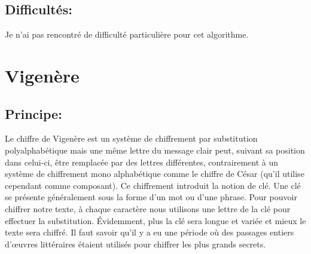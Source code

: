 \documentclass{article}
\begin{document}
\subsection{Difficultés:}
Je n'ai pas rencontré de difficulté particulière pour cet algorithme.

\newpage

\section{Vigenère}
\subsection{Principe:}
Le chiffre de Vigenère est un système de chiffrement par substitution polyalphabétique mais une même lettre du message clair peut, suivant sa position dans celui-ci, être remplacée par des lettres différentes, contrairement à un système de chiffrement mono alphabétique comme le chiffre de César (qu'il utilise cependant comme composant).\newline
Ce chiffrement introduit la notion de clé. Une clé se présente généralement sous la forme d'un mot ou d'une phrase. Pour pouvoir chiffrer notre texte, à chaque caractère nous utilisons une lettre de la clé pour effectuer la substitution. Évidemment, plus la clé sera longue et variée et mieux le texte sera chiffré. Il faut savoir qu'il y a eu une période où des passages entiers d'œuvres littéraires étaient utilisés pour chiffrer les plus grands secrets.
\end{document}

